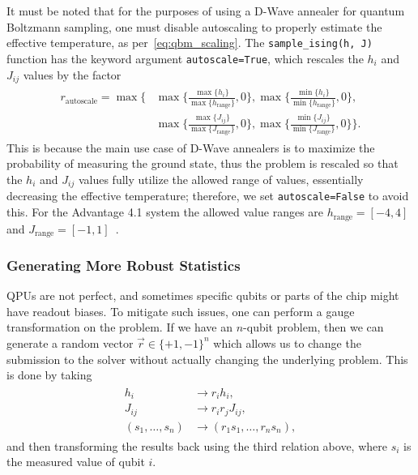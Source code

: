 It must be noted that for the purposes of using a D-Wave annealer for quantum Boltzmann sampling, one must disable autoscaling to properly estimate the effective temperature, as per~\cref{eq:qbm_scaling}.
The \texttt{sample\_ising(h, J)} function has the keyword argument \texttt{autoscale=True}, which rescales the \( h_i \) and \( J_{ij} \) values by the factor~\cite{dwave_solver_parameters}
\begin{align}
\begin{split}
    r_\text{autoscale}
        = \max\Bigg\{
            &\max\bigg\{\frac{\max\{h_i\}}{\max\{h_\text{range}\}},0\bigg\},
            \max\bigg\{\frac{\min\{h_i\}}{\min\{h_\text{range}\}},0\bigg\}, \\
            &\max\bigg\{\frac{\max\{J_{ij}\}}{\max\{J_\text{range}\}},0\bigg\},
            \max\bigg\{\frac{\min\{J_{ij}\}}{\min\{J_\text{range}\}},0\bigg\}
        \Bigg\}.
\end{split}
\end{align}
This is because the main use case of D-Wave annealers is to maximize the probability of measuring the ground state, thus the problem is rescaled so that the \( h_i \) and \( J_{ij} \) values fully utilize the allowed range of values, essentially decreasing the effective temperature; therefore, we set \texttt{autoscale=False} to avoid this.
For the Advantage 4.1 system the allowed value ranges are \( h_\text{range} = [-4, 4] \) and \( J_\text{range} = [-1, 1] \)~\cite{dwave_solver_properties}.

\subsubsection{Generating More Robust Statistics}\label{sec:gauge}
QPUs are not perfect, and sometimes specific qubits or parts of the chip might have readout biases.
To mitigate such issues, one can perform a gauge transformation on the problem.
If we have an \( n \)-qubit problem, then we can generate a random vector \( \vec{r} \in \{+1, -1\}^n \) which allows us to change the submission to the solver without actually changing the underlying problem.
This is done by taking
\begin{align}
\begin{split}
    h_i
        &\rightarrow r_i h_i, \\
    J_{ij}
        &\rightarrow r_i r_j J_{ij}, \\
    (s_1, \dots, s_n)
        &\rightarrow (r_1 s_1, \dots, r_n s_n),
\end{split}
\end{align}
and then transforming the results back using the third relation above, where \( s_i \) is the measured value of qubit \( i \).

